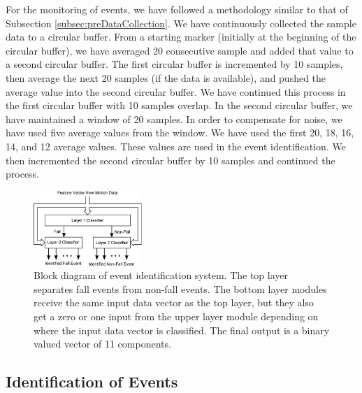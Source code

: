 \documentclass[]{IEEEtran}
\begin{document}
For the monitoring of events, we have followed a methodology similar to that of 
Subsection \ref{subsec:preDataCollection}. We have continuously collected the sample data 
to a circular buffer. From a starting marker (initially at the beginning of the circular buffer), 
we have averaged 20 consecutive sample and added that value to a second circular buffer. The 
first circular buffer is incremented by 10 samples, then average the next 20 samples (if the 
data 
is available), and pushed  the average value into the second circular buffer. We have 
continued this process in 
the first circular buffer with 10 samples overlap. In the second circular buffer, we have 
maintained a window of 20 samples. 
In order to compensate for noise, we have used five average values from the window. We 
have 
used the first 20, 18, 16, 14, and 12 average values. These  values are used in the event 
identification. We then incremented the second circular buffer by 10 samples and continued 
the process.  

\begin{figure}[h]
	\centering
		\includegraphics[width=0.365\textwidth]{figures/TrainedIdentificationModule.eps}
	\caption{Block diagram of event identification system. The top layer separates fall events from non-fall events. The bottom layer modules receive the same input data vector as the top layer, but they also get a zero or one input from the upper layer module depending on where the input data vector is classified. The final output is a binary valued vector of 11 components.}
	\label{fig:TrainedIdentificationModule}
\end{figure}


\subsection{Identification of Events}
\end{document}
